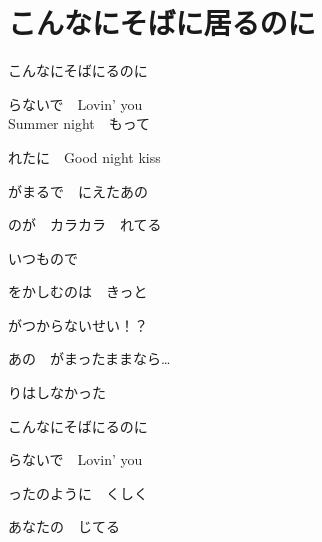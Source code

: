 \section{ こんなにそばに居るのに}

\large{

こんなにそばにるのに

らないで　Lovin' you
\\

Summer night　もって

れたに　Good night kiss

がまるで　にえたあの

のが　カラカラ　れてる

いつもので

をかしむのは　きっと

がつからないせい！？

あの　がまったままなら…

りはしなかった
\\


こんなにそばにるのに

らないで　Lovin' you

ったのように　くしく

あなたの　じてる

}
